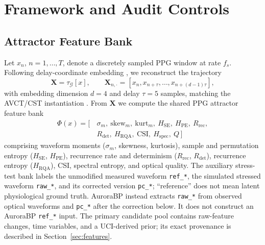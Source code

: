 \documentclass[12pt]{article}
\let\cite\citep
\begin{document}
\section{Framework and Audit Controls}
\label{sec:framework}
\subsection{Attractor Feature Bank}
Let $x_n$, $n = 1,\dots,T$, denote a discretely sampled PPG window at rate $f_s$. Following delay-coordinate embedding \cite{takens1981}, we reconstruct the trajectory
\begin{equation}
\mathbf{X} = \tau_{\mathcal{G}}[x], \qquad \mathbf{X}_{n,\cdot} = [x_n, x_{n+\tau}, \dots, x_{n+(d-1)\tau}],
\label{eq:embed}
\end{equation}
with embedding dimension $d = 4$ and delay $\tau = 5$ samples, matching the AVCT/CST instantiation \cite{avct2026,cst2026}. From $\mathbf{X}$ we compute the shared PPG attractor feature bank
\begin{equation}
\begin{aligned}
\Phi(x) = [\,&\sigma_m,\ \mathrm{skew}_m,\ \mathrm{kurt}_m,\ H_{\mathrm{SE}},\ H_{\mathrm{PE}},\ R_{\mathrm{rec}},\\
&R_{\mathrm{det}},\ H_{\mathrm{RQA}},\ \mathrm{CSI},\ H_{\mathrm{spec}},\ Q\,]
\end{aligned}
\label{eq:featurebank}
\end{equation}
comprising waveform moments ($\sigma_m$, skewness, kurtosis), sample and permutation entropy ($H_{\mathrm{SE}}$, $H_{\mathrm{PE}}$), recurrence rate and determinism ($R_{\mathrm{rec}}$, $R_{\mathrm{det}}$), recurrence entropy ($H_{\mathrm{RQA}}$), CSI, spectral entropy, and optical quality. The auxiliary stress-test bank labels the unmodified measured waveform \texttt{ref\_*}, the simulated stressed waveform \texttt{raw\_*}, and its corrected version \texttt{pc\_*}; ``reference'' does not mean latent physiological ground truth. AuroraBP instead extracts \texttt{raw\_*} from observed optical waveforms and \texttt{pc\_*} after the correction below. It does not construct an AuroraBP \texttt{ref\_*} input. The primary candidate pool contains raw-feature changes, time variables, and a UCI-derived prior; its exact provenance is described in Section~\ref{sec:features}.
\end{document}
